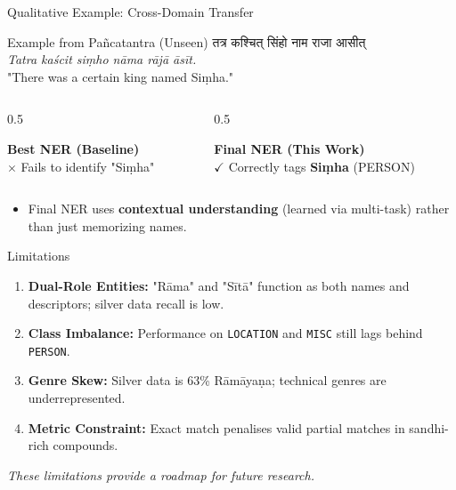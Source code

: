 \documentclass[10pt]{beamer}
\newcommand{\dev}[1]{{\devanagarifont #1}}
\def\tpage{}
\newcommand{\tp}[1]{\def\tpage{#1}}
\begin{document}
\begin{frame}{Qualitative Example: Cross-Domain Transfer}
    \tp{55}
    \begin{block}{Example from Pañcatantra (Unseen)}
        \dev{तत्र कश्चित् सिंहो नाम राजा आसीत्} \\
        \textit{Tatra kaścit siṃho nāma rājā āsīt.} \\
        "There was a certain king named Siṃha."
    \end{block}
    \vfill
    \begin{columns}
        \begin{column}{0.5\textwidth}
            \begin{center}
                \textbf{Best NER (Baseline)} \\
                $\times$ Fails to identify "Siṃha"
            \end{center}
        \end{column}
        \begin{column}{0.5\textwidth}
            \begin{center}
                \textbf{Final NER (This Work)} \\
                $\checkmark$ Correctly tags \textbf{Siṃha} (PERSON)
            \end{center}
        \end{column}
    \end{columns}
    \vfill
    \begin{itemize}
        \item Final NER uses \textbf{contextual understanding} (learned via multi-task) rather than just memorizing names.
    \end{itemize}
\end{frame}

\begin{frame}{Limitations}
    \tp{56}
    \begin{enumerate}
        \item \textbf{Dual-Role Entities:} "Rāma" and "Sītā" function as both names and descriptors; silver data recall is low.
        \item \textbf{Class Imbalance:} Performance on \texttt{LOCATION} and \texttt{MISC} still lags behind \texttt{PERSON}.
        \item \textbf{Genre Skew:} Silver data is 63\% Rāmāyaṇa; technical genres are underrepresented.
        \item \textbf{Metric Constraint:} Exact match penalises valid partial matches in sandhi-rich compounds.
    \end{enumerate}
    \vfill
    \begin{center}
        \textit{These limitations provide a roadmap for future research.}
    \end{center}
\end{frame}
\end{document}
